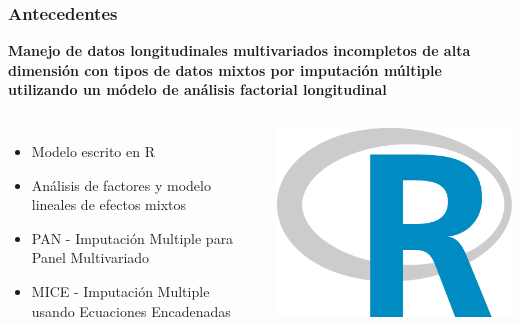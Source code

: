 \documentclass{beamer}%
\begin{document}
\begin{frame}
\frametitle{\textbf{Antecedentes}}
\textbf{Manejo de datos longitudinales multivariados incompletos de alta dimensi\'on con tipos de datos mixtos por imputaci\'on m\'ultiple utilizando un m\'odelo de an\'alisis factorial longitudinal}
 \begin{columns}[t]
	\begin{itemize}
	\item Modelo escrito en R
	\item An\'alisis de factores y modelo lineales de efectos mixtos
	\item PAN - Imputaci\'on Multiple para Panel Multivariado
	\item MICE - Imputaci\'on Multiple usando Ecuaciones Encadenadas 
	\end{itemize}
  	\begin{center}\includegraphics[height=0.3\textheight]{r.PNG}\end{center}
  \end{columns}

\end{frame}
\end{document}
